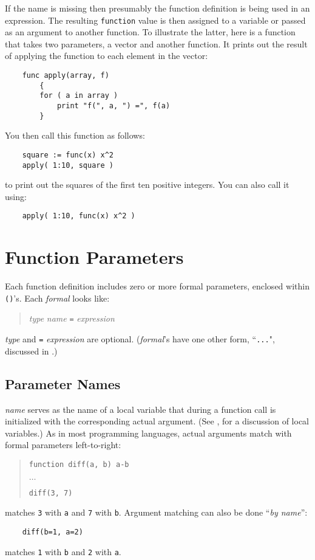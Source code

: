 If the name is missing then presumably the function definition is being
used in an expression. The resulting {\tt function} value is then assigned
to a variable or passed as an argument to another function.  To illustrate
the latter, here is a function that takes two parameters, a vector and
another function.  It prints out the result of applying the function
to each element in the vector:
\begin{verbatim}
    func apply(array, f)
        {
        for ( a in array )
            print "f(", a, ") =", f(a)
        }
\end{verbatim}
You then call this function as follows:
\begin{verbatim}
    square := func(x) x^2
    apply( 1:10, square )
\end{verbatim}
to print out the squares of the first ten positive integers.
You can also  call it using:
\begin{verbatim}
    apply( 1:10, func(x) x^2 )
\end{verbatim}

\section{Function Parameters}

Each function definition includes zero or more formal parameters,
enclosed within {\tt ()}'s.  Each {\em formal} looks like:
\begin{quote}
    {\em type} {\em name} {\tt =} {\em expression}
\end{quote}
{\em type} and {\tt =} {\em expression} are optional.  ({\em formal\/}'s have
one other form, ``{\tt ...}", discussed in .)

\subsection{Parameter Names}
\label{param-names}

{\em name} serves
as the name of a local variable that during a function call is initialized
with the corresponding actual argument.  (See , for a discussion
of local variables.)
As in most programming languages,
actual arguments match with formal parameters left-to-right:
\begin{quote}
    {\tt function diff(a, b) a-b}

    $\ldots$

    {\tt diff(3, 7)}
\end{quote}
matches {\tt 3} with {\tt a} and {\tt 7} with {\tt b}.  Argument
matching can also be done ``{\em by name}'':
\begin{verbatim}
    diff(b=1, a=2)
\end{verbatim}
matches {\tt 1} with {\tt b} and {\tt 2} with {\tt a}.

